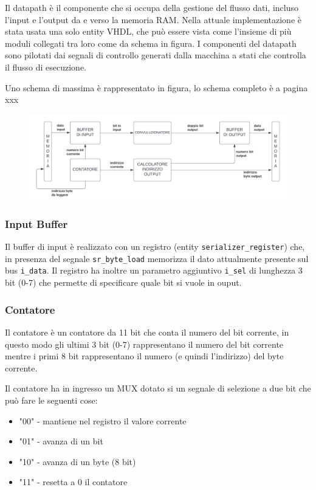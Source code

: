 \documentclass[12pt, a4paper]{article}
\begin{document}
Il datapath è il componente che si occupa della gestione del flusso dati, incluso l'input e l'output
da e verso la memoria RAM.
Nella attuale implementazione è stata usata una solo entity VHDL, che può essere vista come l'insieme
di più moduli collegati tra loro come da schema in figura.
I componenti del datapath sono pilotati dai segnali di controllo generati dalla macchina a stati che
controlla il flusso di esecuzione.

Uno schema di massima è rappresentato in figura, lo schema completo è a pagina xxx


\begin{figure}[h!]
    \includegraphics[scale=0.32]{datapath.png}
\end{figure}

\subsubsection{Input Buffer}

Il buffer di input è realizzato con un registro (entity \texttt{serializer\_register}) che, in presenza del segnale 
\texttt{sr\_byte\_load} memorizza il dato attualmente presente sul bus \texttt{i\_data}.
Il registro ha inoltre un parametro aggiuntivo \texttt{i\_sel} di lunghezza 3 bit (0-7)
che permette di specificare quale bit si vuole in ouput.

\pagebreak

\subsubsection{Contatore}

Il contatore è un contatore da 11 bit che conta il numero del bit corrente,
in questo modo gli ultimi 3 bit (0-7) rappresentano il numero del bit corrente
mentre i primi 8 bit rappresentano il numero (e quindi l'indirizzo) del byte corrente.

Il contatore ha in ingresso un MUX dotato si un segnale di selezione a due bit che può fare le seguenti cose:
\begin{itemize}[itemsep=4pt, topsep=4pt]
    \item "00" - mantiene nel registro il valore corrente
    \item "01" - avanza di un bit
    \item "10" - avanza di un byte (8 bit)
    \item "11" - resetta a 0 il contatore
\end{itemize}
\end{document}

